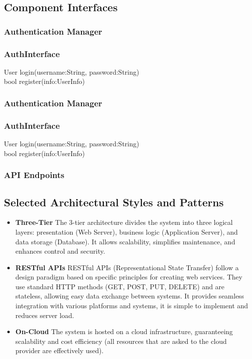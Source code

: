 \documentclass[a4paper,12pt]{article}
\begin{document}
\subsection{Component Interfaces}
\subsubsection{Authentication Manager}
\subsubsection*{AuthInterface}
User login(username:String, password:String)\\
bool register(info:UserInfo)

\subsubsection{Authentication Manager}
\subsubsection*{AuthInterface}
User login(username:String, password:String)\\
bool register(info:UserInfo)

\subsubsection{API Endpoints}
\subsection{Selected Architectural Styles and Patterns}
\begin{itemize}
    \item \textbf{Three-Tier} The 3-tier architecture divides the system into three logical layers: presentation (Web Server), business logic (Application Server), and data storage (Database). It allows scalability, simplifies maintenance, and enhances control and security.

    \item \textbf{RESTful APIs} RESTful APIs (Representational State Transfer) follow a design paradigm based on specific principles for creating web services. They use standard HTTP methods (GET, POST, PUT, DELETE) and are stateless, allowing easy data exchange between systems. It provides seamless integration with various platforms and systems, it is simple to implement and reduces server load.

    \item \textbf{On-Cloud} The system is hosted on a cloud infrastructure, guaranteeing scalability and cost efficiency (all resources that are asked to the cloud provider are effectively used).
\end{itemize}
\end{document}
